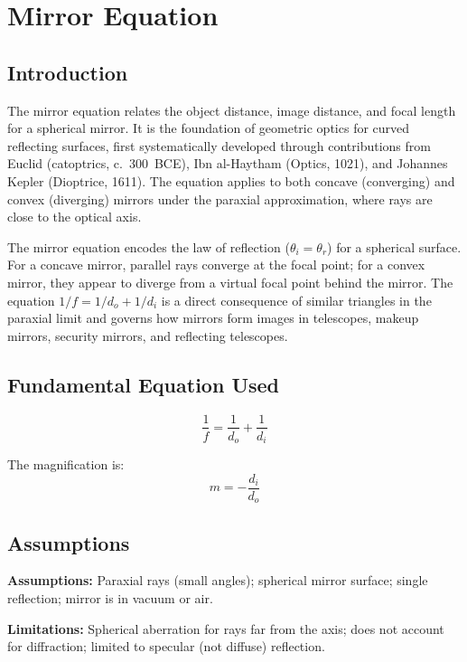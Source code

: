 \chapter{Mirror Equation}

\section*{Introduction}

The mirror equation relates the object distance, image distance, and focal length for a spherical mirror. It is the foundation of geometric optics for curved reflecting surfaces, first systematically developed through contributions from Euclid (catoptrics, c.~300~BCE), Ibn al-Haytham (Optics, 1021), and Johannes Kepler (Dioptrice, 1611). The equation applies to both concave (converging) and convex (diverging) mirrors under the paraxial approximation, where rays are close to the optical axis.

The mirror equation encodes the law of reflection ($\theta_{i} = \theta_{r}$) for a spherical surface. For a concave mirror, parallel rays converge at the focal point; for a convex mirror, they appear to diverge from a virtual focal point behind the mirror. The equation $1/f = 1/d_{o} + 1/d_{i}$ is a direct consequence of similar triangles in the paraxial limit and governs how mirrors form images in telescopes, makeup mirrors, security mirrors, and reflecting telescopes.
\section*{Fundamental Equation Used}

\begin{equation}
\boxed{\; \frac{1}{f} = \frac{1}{d_{o}} + \frac{1}{d_{i}}\;}
\label{eq:mirror}
\end{equation}

The magnification is:
\begin{equation}
m = -\frac{d_{i}}{d_{o}}
\label{eq:magnification}
\end{equation}
\section*{Assumptions}

\textbf{Assumptions:} Paraxial rays (small angles); spherical mirror surface; single reflection; mirror is in vacuum or air.


\textbf{Limitations:} Spherical aberration for rays far from the axis; does not account for diffraction; limited to specular (not diffuse) reflection.



